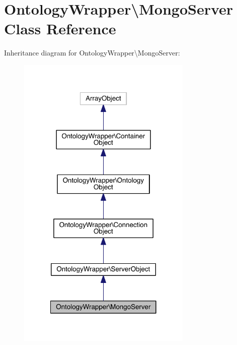 \hypertarget{class_ontology_wrapper_1_1_mongo_server}{\section{Ontology\-Wrapper\textbackslash{}Mongo\-Server Class Reference}
\label{class_ontology_wrapper_1_1_mongo_server}
}


Inheritance diagram for Ontology\-Wrapper\textbackslash{}Mongo\-Server\-:
\nopagebreak
\begin{figure}[H]
\begin{center}
\leavevmode
\includegraphics[width=236pt]{class_ontology_wrapper_1_1_mongo_server__inherit__graph}
\end{center}
\end{figure}


